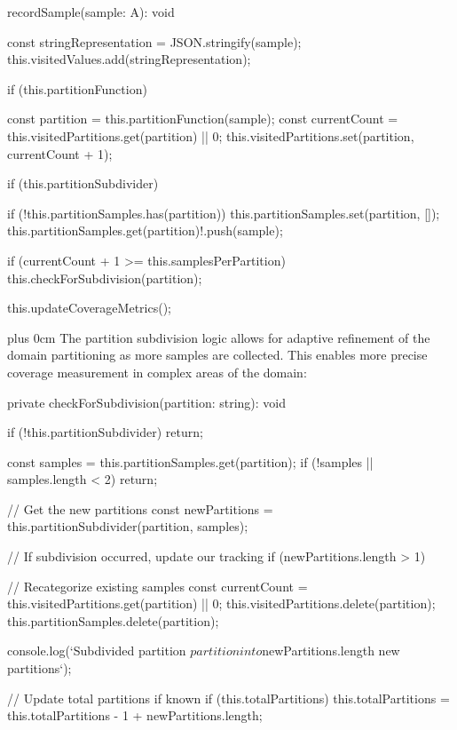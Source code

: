 \documentclass[11pt,a4paper]{article}
\newcommand{\justifytext}{\leftskip=0pt \rightskip=0pt plus 0cm}
\begin{document}
\begin{wrappedcode}
  recordSample(sample: A): void {
    const stringRepresentation = JSON.stringify(sample);
    this.visitedValues.add(stringRepresentation);
    
    if (this.partitionFunction) {
      const partition = this.partitionFunction(sample);
      const currentCount = this.visitedPartitions.get(partition) || 0;
      this.visitedPartitions.set(partition, currentCount + 1);
      
      if (this.partitionSubdivider) {
        if (!this.partitionSamples.has(partition)) {
          this.partitionSamples.set(partition, []);
        }
        this.partitionSamples.get(partition)!.push(sample);
        
        if (currentCount + 1 >= this.samplesPerPartition) {
          this.checkForSubdivision(partition);
        }
      }
    }
    
    this.updateCoverageMetrics();
  }
\end{wrappedcode}

\justifytext
The partition subdivision logic allows for adaptive refinement of the domain partitioning as more samples are collected. This enables more precise coverage measurement in complex areas of the domain:

\begin{wrappedcode}
  private checkForSubdivision(partition: string): void {
    if (!this.partitionSubdivider) return;
    
    const samples = this.partitionSamples.get(partition);
    if (!samples || samples.length < 2) return;
    
    // Get the new partitions
    const newPartitions = this.partitionSubdivider(partition, samples);
    
    // If subdivision occurred, update our tracking
    if (newPartitions.length > 1) {
      // Recategorize existing samples
      const currentCount = this.visitedPartitions.get(partition) || 0;
      this.visitedPartitions.delete(partition);
      this.partitionSamples.delete(partition);
      
      console.log(`Subdivided partition ${partition} into ${newPartitions.length} new partitions`);
      
      // Update total partitions if known
      if (this.totalPartitions) {
        this.totalPartitions = this.totalPartitions - 1 + newPartitions.length;
      }
    }
  }
\end{wrappedcode}
\end{document}
